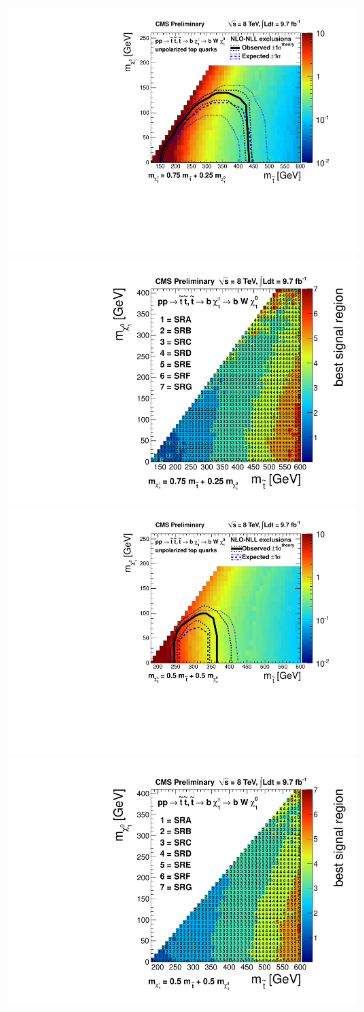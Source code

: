  \begin{figure}[hbt]
  \begin{center}
       \includegraphics[height=6.5cm]{plots/combinePlots_T2bw_x75.pdf}%
       \includegraphics[height=6.5cm]{plots/combinePlots_T2bw_x75_bestSignalRegion.pdf}
       \includegraphics[height=6.5cm]{plots/combinePlots_T2bw_x50.pdf}%
       \includegraphics[height=6.5cm]{plots/combinePlots_T2bw_x50_bestSignalRegion.pdf}

\end{center}
\end{figure}
